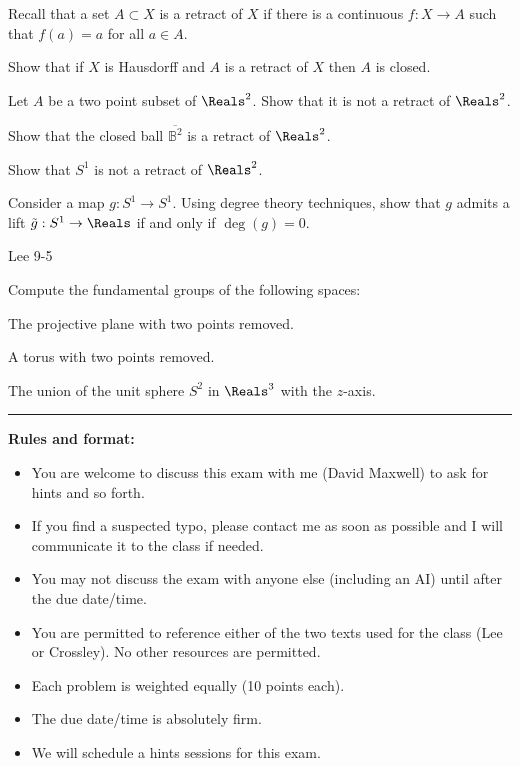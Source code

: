 \documentclass[minion]{homework651}
\begin{document}
\begin{problems}
\problem Recall that a set $A\subset X$ is a retract of $X$ if there 
is a continuous $f:X\to A$ such that $f(a)=a$ for all $a\in A$.
\begin{subproblems}
\item Show that if $X$ is Hausdorff and $A$ is a retract of $X$ then $A$ is closed.
\item Let $A$ be a two point subset of $\Reals^2$. Show that it is not a retract of $\Reals^2$.
\item Show that the closed ball $\overline{\mathbb{B}^2}$ is a retract of $\Reals^2$.
\item Show that $S^1$ is not a retract of $\Reals^2$.
\end{subproblems}

\problem Consider a map $g:S^1 \rightarrow S^1$.  Using 
degree theory techniques, show that $g$ admits a lift
$\tilde g:S^1\rightarrow \Reals$ if and only if $\deg(g)=0$.

\problem Lee 9-5

\problem Compute the fundamental groups of the following spaces:
\begin{subproblems}
\item The projective plane with two points removed.
\item A torus with two points removed.
\item The union of the unit sphere $S^2$ in $\Reals^3$ with the $z$-axis.
\end{subproblems}

\end{problems}
\bigskip
\hrule
\bigskip
{\bf  Rules and format:}
\begin{itemize}

\item You are welcome to discuss this exam with me (David Maxwell) to ask for hints and so forth.
\item  If you find a suspected typo, please contact me as soon as possible and I will
communicate it to the class if needed.
\item You may not discuss the exam with anyone else (including an AI) until after the due date/time.
\item You are permitted to reference either of the two texts used for the class (Lee or Crossley).
No other resources are permitted.
\item Each problem is weighted equally (10 points each).
\item The due date/time is absolutely firm.
\item We will schedule a hints sessions for this exam.
\end{itemize}
 
\end{document}

